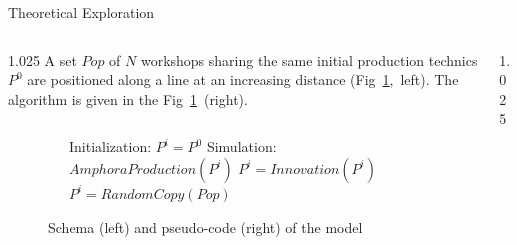 \documentclass[final]{beamer}
\newlength{\sepwid}
\newlength{\onecolwid}
\newlength{\twocolwid}
\begin{document}
\begin{frame}[t]
\begin{columns}[t]
\begin{column}{\twocolwid}
\begin{block}{Theoretical Exploration}
\begin{columns}[t,totalwidth=\twocolwid]
\begin{column}{1.025\onecolwid}
A set $Pop$ of $N$ workshops sharing the same initial production technics $P^{0}$ are positioned along a line at an increasing distance (Fig~\ref{fig:mod},~left). %
The algorithm is given in the Fig~\ref{fig:mod}~(right).  

	\begin{figure}
\begin{columns}
    \begin{column}{.4\textwidth}
	    \centering
	\resizebox{\textwidth}{!}{
	    
}
    \end{column}
    \begin{column}{.6\textwidth}
	\begin{algorithmic}
	    \footnotesize
	    \State Initialization:
	    \State $P^{i} = P^{0}$
	    \EndFor
	    \State Simulation:
	    \State $AmphoraProduction(P^{i})$
	    \State $P^{i}=Innovation(P^{i})$ 	
	    \State $P^{i}=RandomCopy(Pop)$		
	    \EndIf
	    \EndFor
	    \EndLoop
	\end{algorithmic}
    \end{column}
\end{columns}

\singlespace
	    \caption{Schema (left) and pseudo-code (right) of the model }
	    \label{fig:mod}
	\end{figure}





\end{column}


\begin{column}{1.025\onecolwid} %
\justify


\end{column}
\end{columns}
\end{block}
\end{column}
\end{columns}
\end{frame}
\end{document}
